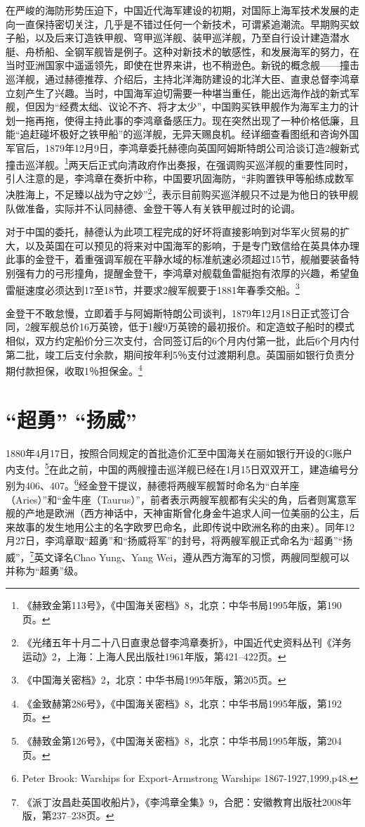 \documentclass[12pt,UTF8]{ctexbook}
\begin{document}
在严峻的海防形势压迫下，中国近代海军建设的初期，对国际上海军技术发展的走向一直保持密切关注，几乎是不错过任何一个新技术，可谓紧追潮流。早期购买蚊子船，以及后来订造铁甲舰、穹甲巡洋舰、装甲巡洋舰，乃至自行设计建造潜水艇、舟桥船、全钢军舰皆是例子。这种对新技术的敏感性，和发展海军的努力，在当时亚洲国家中遥遥领先，即使在世界来讲，也不稍逊色。新锐的概念舰——撞击巡洋舰，通过赫德推荐、介绍后，主持北洋海防建设的北洋大臣、直隶总督李鸿章立刻产生了兴趣。当时，中国海军迫切需要一种堪当重任，能出远海作战的新式军舰，但因为“经费太绌、议论不齐、将才太少”，中国购买铁甲舰作为海军主力的计划一拖再拖，使得主持此事的李鸿章备感压力。现在突然出现了一种价格低廉，且能“追赶碰坏极好之铁甲船”的巡洋舰，无异天赐良机。经详细查看图纸和咨询外国军官后，1879年12月9日，李鸿章委托赫德向英国阿姆斯特朗公司洽谈订造2艘新式撞击巡洋舰。\footnote{《赫致金第113号》，《中国海关密档》8，北京：中华书局1995年版，第190页。}两天后正式向清政府作出奏报，在强调购买巡洋舰的重要性同时，引人注意的是，李鸿章在奏折中称，中国要巩固海防，“非购置铁甲等船练成数军决胜海上，不足臻以战为守之妙”\footnote{《光绪五年十月二十八日直隶总督李鸿章奏折》，中国近代史资料丛刊《洋务运动》2，上海：上海人民出版社1961年版，第421--422页。}，表示目前购买巡洋舰只不过是为他日的铁甲舰队做准备，实际并不认同赫德、金登干等人有关铁甲舰过时的论调。

对于中国的委托，赫德认为此项工程完成的好坏将直接影响到对华军火贸易的扩大，以及英国在可以预见的将来对中国海军的影响，于是专门致信给在英具体办理此事的金登干，着重强调军舰在平静水域的标准航速必须超过15节，舰艏要装备特别强有力的弓形撞角，提醒金登干，李鸿章对舰载鱼雷艇抱有浓厚的兴趣，希望鱼雷艇速度必须达到17至18节，并要求2艘军舰要于1881年春季交船。\footnote{《中国海关密档》2，北京：中华书局1995年版，第205页。}

金登干不敢怠慢，立即着手与阿姆斯特朗公司谈判，1879年12月18日正式签订合同，2艘军舰总价16万英镑，低于1艘9万英镑的最初报价。和定造蚊子船时的模式相似，双方约定船价分三次支付，合同签订后的6个月内付第一批，此后6个月内付第二批，竣工后支付余款，期间按年利5％支付过渡期利息。英国丽如银行负责分期付款担保，收取1％担保金。\footnote{《金致赫第286号》，《中国海关密档》8，北京：中华书局1995年版，第192页。}

\section{“超勇” “扬威”}

1880年4月17日，按照合同规定的首批造价汇至中国海关在丽如银行开设的G账户内支付。\footnote{《赫致金第126号》，《中国海关密档》8，北京：中华书局1995年版，第204页。}在此之前，中国的两艘撞击巡洋舰已经在1月15日双双开工，建造编号分别为406、407。\footnote{Peter Brook: Warships for Export-Armstrong Warships 1867-1927,1999,p48.}经金登干提议，赫德将两艘军舰暂时命名为“白羊座（Aries）”和“金牛座（Taurus）”，前者表示两艘军舰都有尖尖的角，后者则寓意军舰的产地是欧洲（西方神话中，天神宙斯曾化身金牛追求人间一位美丽的公主，后来故事的发生地用公主的名字欧罗巴命名，此即传说中欧洲名称的由来）。同年12月27日，李鸿章取“超勇”和“扬威将军”的封号，将两艘军舰正式命名为“超勇”“扬威”，\footnote{《派丁汝昌赴英国收船片》，《李鸿章全集》9，合肥：安徽教育出版社2008年版，第237--238页。}英文译名Chao Yung、Yang Wei，遵从西方海军的习惯，两艘同型舰可以并称为“超勇”级。
\end{document}
